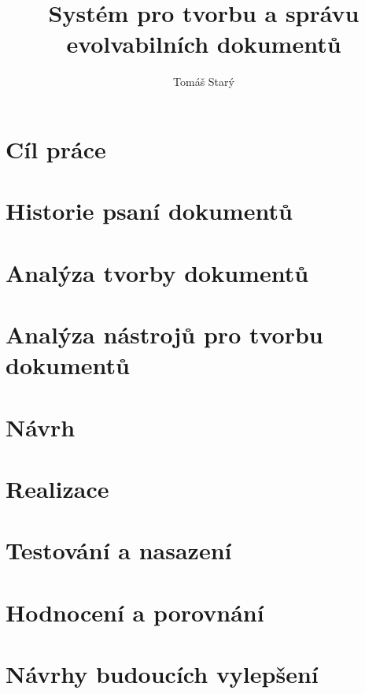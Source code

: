 \documentclass[thesis=B,czech]{FITthesis}[2012/06/26]
\title{Systém pro tvorbu a správu evolvabilních dokumentů}
\author{Tomáš Starý} %
\begin{document}
\renewcommand{\thelisting}{\arabic{chapter}.\arabic{listing}}

\begin{introduction}
	
\end{introduction}

\chapter{Cíl práce}


\chapter{Historie psaní dokumentů}


\chapter{Analýza tvorby dokumentů}


\chapter{Analýza nástrojů pro tvorbu dokumentů}


\chapter{Návrh}


\chapter{Realizace}


\chapter{Testování a nasazení}


\chapter{Hodnocení a porovnání}


\chapter{Návrhy budoucích vylepšení}


\begin{conclusion}
	
\end{conclusion}
\printbibliography
\appendix
\end{document}
